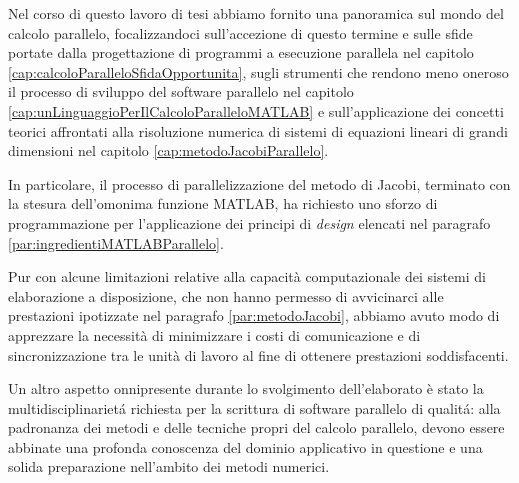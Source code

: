 Nel corso di questo lavoro di tesi abbiamo fornito una panoramica sul mondo del calcolo parallelo, focalizzandoci sull'accezione di questo termine e sulle sfide portate dalla progettazione di programmi a esecuzione parallela nel capitolo \ref{cap:calcoloParalleloSfidaOpportunita}, sugli strumenti che rendono meno oneroso il processo di sviluppo del software parallelo
nel capitolo \ref{cap:unLinguaggioPerIlCalcoloParalleloMATLAB} e sull'applicazione dei concetti teorici affrontati alla risoluzione numerica di sistemi di equazioni lineari di grandi dimensioni nel capitolo \ref{cap:metodoJacobiParallelo}.

In particolare, il processo di parallelizzazione del metodo di Jacobi, terminato con la stesura dell'omonima funzione 
MATLAB, ha richiesto uno sforzo di programmazione per l'applicazione dei principi di \textit{design} elencati nel paragrafo \ref{par:ingredientiMATLABParallelo}.

Pur con alcune limitazioni relative alla capacit\`a computazionale dei sistemi di elaborazione a disposizione, che non hanno 
permesso di avvicinarci alle prestazioni ipotizzate nel paragrafo \ref{par:metodoJacobi}, 
abbiamo avuto modo di apprezzare la necessit\`a di minimizzare i costi di comunicazione e di sincronizzazione tra le unit\`a di lavoro 
al fine di ottenere prestazioni soddisfacenti.%

Un altro aspetto onnipresente durante lo svolgimento dell'elaborato \`e stato la multidisciplinariet\'a richiesta per la scrittura 
di software parallelo di qualit\'a: alla padronanza dei metodi e delle tecniche propri del calcolo parallelo, devono essere 
abbinate una profonda conoscenza del dominio applicativo in questione e una solida preparazione nell'ambito dei metodi numerici.